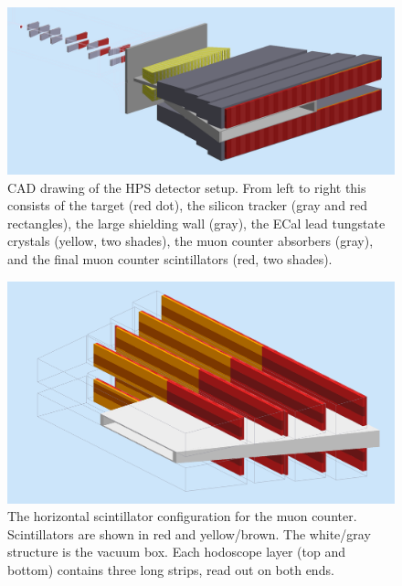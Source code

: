 \begin{figure}[!ht]
\includegraphics[scale=0.22]{muon/HPS_view2.png}
\caption{\small{CAD drawing of the HPS detector setup.  From left to right this consists of the target (red dot), the silicon tracker
(gray and red rectangles), the large shielding wall (gray), the ECal lead tungstate crystals (yellow, two shades), the muon counter absorbers
(gray), and the final muon counter scintillators (red, two shades).}}
\label{fig:HPS_view2}
\end{figure}


\begin{figure}[!ht]
\includegraphics[scale=0.22]{muon/Muon2b.png}
\caption{\small{The horizontal scintillator configuration for the muon counter. Scintillators are
shown in red and yellow/brown.  The white/gray structure is the vacuum box.  Each hodoscope layer (top
and bottom) contains three long strips, read out on both ends.
}}
\label{fig:Muon2p}
\end{figure}

